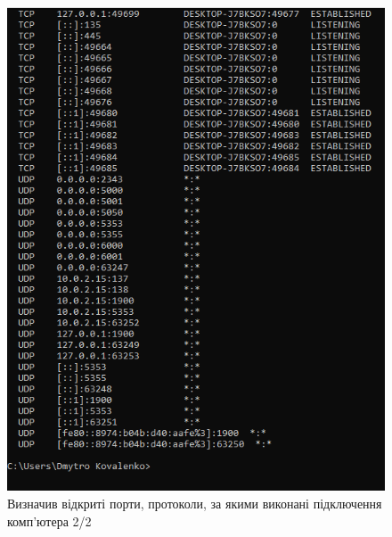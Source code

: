 \documentclass{article}
\begin{document}
\begin{normalsize}
\begin{figure}[H]
	\centering
	\includegraphics[width=\textwidth]{42}
	\caption{Визначив відкриті порти, протоколи, за якими виконані
		підключення комп'ютера 2/2}
\end{figure}


\end{normalsize}
\end{document}
